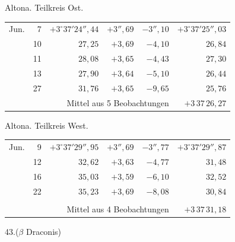 \noindent\begin{minipage}[t]{.495\textwidth}\centering Altona. Teilkreis Ost.\par\smallskip
{\scriptsize\setlength{\tabcolsep}{1pt}\renewcommand{\arraystretch}{1.2}\begin{tabular}{lr|r|r|r|r|}
Jun.&7&$+3^\circ37'24''{,}44$&$+3''{,}69$&$-3''{,}10$&$+3^\circ37'25''{,}03$\\
&10&$27{,}25$&$+3{,}69$&$-4{,}10$&$26{,}84$\\
&11&$28{,}08$&$+3{,}65$&$-4{,}43$&$27{,}30$\\
&13&$27{,}90$&$+3{,}64$&$-5{,}10$&$26{,}44$\\
&27&$31{,}76$&$+3{,}65$&$-9{,}65$&$25{,}76$\\
\cline{6-6}\multicolumn{5}{r}{Mittel aus 5 Beobachtungen}&$+3\,37\,26{,}27$
\end{tabular}}\end{minipage}\hfill\begin{minipage}[t]{.495\textwidth}\centering Altona. Teilkreis West.\par\smallskip
{\scriptsize\setlength{\tabcolsep}{1pt}\renewcommand{\arraystretch}{1.2}\begin{tabular}{lr|r|r|r|r}
Jun.&9&$+3^\circ37'29''{,}95$&$+3''{,}69$&$-3''{,}77$&$+3^\circ37'29''{,}87$\\
&12&$32{,}62$&$+3{,}63$&$-4{,}77$&$31{,}48$\\
&16&$35{,}03$&$+3{,}59$&$-6{,}10$&$32{,}52$\\
&22&$35{,}23$&$+3{,}69$&$-8{,}08$&$30{,}84$\\
&&&&&\\
\cline{6-6}\multicolumn{5}{r}{Mittel aus 4 Beobachtungen}&$+3\,37\,31{,}18$
\end{tabular}}\end{minipage}
\par\vspace{4mm}
\begin{center}43.\quad ($\beta$ Draconis)\end{center}

